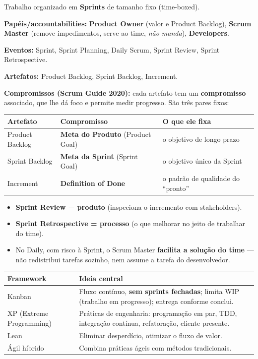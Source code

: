 \begin{conceito}
Trabalho organizado em \textbf{Sprints} de tamanho fixo (time-boxed).

\textbf{Papéis/accountabilities:} \textbf{Product Owner} (valor e Product
Backlog), \textbf{Scrum Master} (remove impedimentos, serve ao time, \emph{não
manda}), \textbf{Developers}.

\textbf{Eventos:} Sprint, Sprint Planning, Daily Scrum, Sprint Review, Sprint
Retrospective.

\textbf{Artefatos:} Product Backlog, Sprint Backlog, Increment.

\textbf{Compromissos (Scrum Guide 2020):} cada artefato tem um
\textbf{compromisso} associado, que lhe dá foco e permite medir progresso.
São três pares fixos:

\begin{center}
\begin{tabular}{@{}p{4.2cm}p{4.4cm}p{4cm}@{}}
\toprule
\textbf{Artefato} & \textbf{Compromisso} & \textbf{O que ele fixa} \\
\midrule
Product Backlog & \textbf{Meta do Produto} (Product Goal) & o objetivo de longo prazo \\
Sprint Backlog & \textbf{Meta da Sprint} (Sprint Goal) & o objetivo único da Sprint \\
Increment & \textbf{Definition of Done} & o padrão de qualidade do ``pronto'' \\
\bottomrule
\end{tabular}
\end{center}

\begin{itemize}
\item \textbf{Sprint Review = produto} (inspeciona o incremento com
stakeholders).
\item \textbf{Sprint Retrospective = processo} (o que melhorar no jeito de
trabalhar do time).
\item No Daily, com risco à Sprint, o Scrum Master \textbf{facilita a
solução do time} --- não redistribui tarefas sozinho, nem assume a tarefa do
desenvolvedor.
\end{itemize}
\end{conceito}

\begin{center}
\begin{tabular}{@{}p{2.4cm}p{9.8cm}@{}}
\toprule
\textbf{Framework} & \textbf{Ideia central} \\
\midrule
Kanban & Fluxo contínuo, \textbf{sem sprints fechadas}; limita WIP (trabalho em progresso); entrega conforme conclui. \\
XP (Extreme Programming) & Práticas de engenharia: programação em par, TDD, integração contínua, refatoração, cliente presente. \\
Lean & Eliminar desperdício, otimizar o fluxo de valor. \\
Ágil híbrido & Combina práticas ágeis com métodos tradicionais. \\
\bottomrule
\end{tabular}
\end{center}

